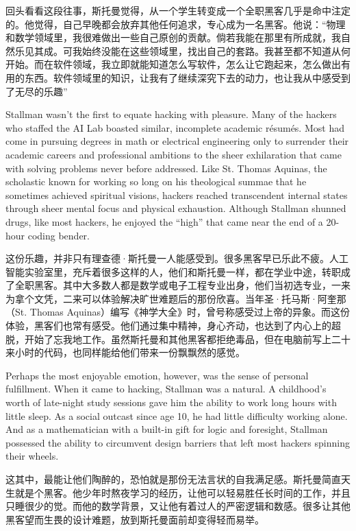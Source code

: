 \ifdefined\chs
回头看看这段往事，斯托曼觉得，从一个学生转变成一个全职黑客几乎是命中注定的。他觉得，自己早晚都会放弃其他任何追求，专心成为一名黑客。他说：``物理和数学领域里，我很难做出一些自己原创的贡献。倘若我能在那里有所成就，我自然乐见其成。可我始终没能在这些领域里，找出自己的套路。我甚至都不知道从何开始。而在软件领域，我立即就能知道怎么写软件，怎么让它跑起来，怎么做出有用的东西。软件领域里的知识，让我有了继续深究下去的动力，也让我从中感受到了无尽的乐趣''
\fi

\ifdefined\eng
Stallman wasn't the first to equate hacking with pleasure. Many of the hackers who staffed the AI Lab boasted similar, incomplete academic résumés. Most had come in pursuing degrees in math or electrical engineering only to surrender their academic careers and professional ambitions to the sheer exhilaration that came with solving problems never before addressed. Like St. Thomas Aquinas, the scholastic known for working so long on his theological summae that he sometimes achieved spiritual visions, hackers reached transcendent internal states through sheer mental focus and physical exhaustion. Although Stallman shunned drugs, like most hackers, he enjoyed the ``high'' that came near the end of a 20-hour coding bender.
\fi

\ifdefined\chs
这份乐趣，并非只有理查德·斯托曼一人能感受到。很多黑客早已乐此不疲。人工智能实验室里，充斥着很多这样的人，他们和斯托曼一样，都在学业中途，转职成了全职黑客。其中大多数人都是数学或电子工程专业出身，他们当初选专业，一来为拿个文凭，二来可以体验解决旷世难题后的那份欣喜。当年圣·托马斯·阿奎那（St. Thomas Aquinas）编写《神学大全》时，曾号称感受过上帝的异象。而这份体验，黑客们也常有感受。他们通过集中精神，身心齐动，也达到了内心上的超脱，开始了忘我地工作。虽然斯托曼和其他黑客都拒绝毒品，但在电脑前写上二十来小时的代码，也同样能给他们带来一份飘飘然的感觉。
\fi

\ifdefined\eng
Perhaps the most enjoyable emotion, however, was the sense of personal fulfillment. When it came to hacking, Stallman was a natural. A childhood's worth of late-night study sessions gave him the ability to work long hours with little sleep. As a social outcast since age 10, he had little difficulty working alone. And as a mathematician with a built-in gift for logic and foresight, Stallman possessed the ability to circumvent design barriers that left most hackers spinning their wheels.
\fi

\ifdefined\chs
这其中，最能让他们陶醉的，恐怕就是那份无法言状的自我满足感。斯托曼简直天生就是个黑客。他少年时熬夜学习的经历，让他可以轻易胜任长时间的工作，并且只睡很少的觉。而他的数学背景，又让他有着过人的严密逻辑和数感。很多让其他黑客望而生畏的设计难题，放到斯托曼面前却变得轻而易举。
\fi

